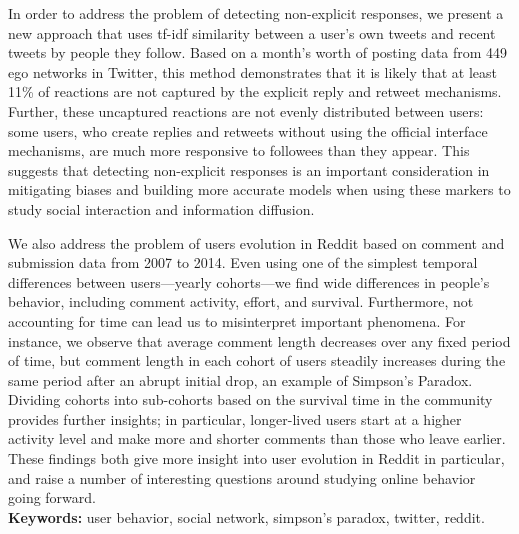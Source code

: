 \documentclass[11pt,twoside,a4paper]{book}
\begin{document}
In order to address the problem of detecting non-explicit responses, we present a new approach that uses tf-idf similarity between a user's own tweets and recent tweets by people they follow. Based on a month's worth of posting data from 449 ego networks in Twitter, this method demonstrates that it is likely that at least 11\% of reactions are not captured by the explicit reply and retweet mechanisms. Further, these uncaptured reactions are not evenly distributed between users: some users, who create replies and retweets without using the official interface mechanisms, are much more responsive to followees than they appear. This suggests that detecting non-explicit responses is an important consideration in mitigating biases and building more accurate models when using these markers to study social interaction and information diffusion. 

We also address the problem of users evolution in Reddit based on comment and submission data from 2007 to 2014. Even using one of the simplest temporal differences between users—yearly cohorts—we find wide differences in people's behavior, including comment activity, effort, and survival. Furthermore, not accounting for time can lead us to misinterpret important phenomena. For instance, we observe that average comment length decreases over any fixed period of time, but comment length in each cohort of users steadily increases during the same period after an abrupt initial drop, an example of Simpson's Paradox. Dividing cohorts into sub-cohorts based on the survival time in the community provides further insights; in particular, longer-lived users start at a higher activity level and make more and shorter comments than those who leave earlier. These findings both give more insight into user evolution in Reddit in particular, and raise a number of interesting questions around studying online behavior going forward.
\\

\noindent \textbf{Keywords:} user behavior, social network, simpson's paradox, twitter, reddit.

\tableofcontents    %

\end{document}
